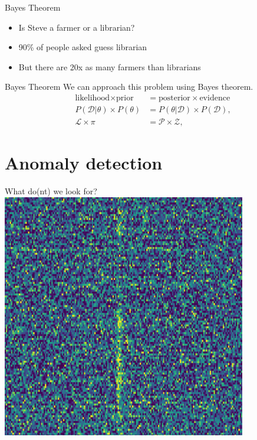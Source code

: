 \documentclass{beamer}
\begin{document}
  \begin{frame}{Bayes Theorem}
    \begin{itemize}
      \item Is Steve a farmer or a librarian?
      \item 90\% of people asked guess librarian~\cite{tversky1986framing}
      \item But there are 20x as many farmers than librarians

    \end{itemize}
    \vfill
  \end{frame}

  \begin{frame}{Bayes Theorem}
    We can approach this problem using Bayes theorem.
    \begin{align}
            \text{likelihood} \times \text{prior} &= \text{posterior} \times \text{evidence} \\
            P(\mathcal{D}|\theta) \times P(\theta) &= P(\theta|\mathcal{D}) \times P(\mathcal{D}), \\
            \mathcal{L} \times \pi &= \mathcal{P} \times \mathcal{Z},
        \end{align}
   \end{frame}

  \section{Anomaly detection}

  \begin{frame}{What do(nt) we look for?}
    \centering
    \includegraphics[width=0.8\textwidth]{frb.png}
  \end{frame}
\end{document}
